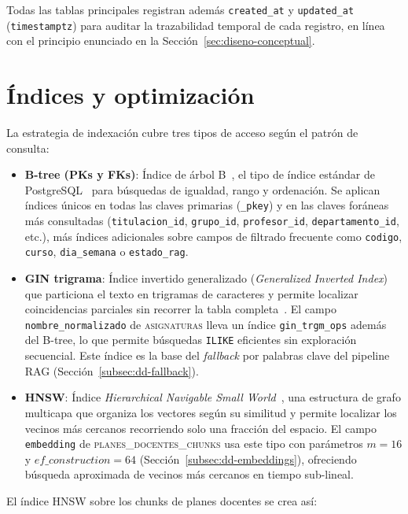 Todas las tablas principales registran además \texttt{created\_at} y \texttt{updated\_at} (\texttt{timestamptz}) para auditar la trazabilidad temporal de cada registro, en línea con el principio enunciado en la Sección~\ref{sec:diseno-conceptual}.

\section{Índices y optimización}\label{sec:indices}

La estrategia de indexación cubre tres tipos de acceso según el patrón de consulta:

\begin{itemize}
    \item \textbf{B-tree (PKs y FKs)}: Índice de árbol B~\cite{bayer1972btree}, el tipo de índice estándar de PostgreSQL~\cite{postgresBtree} para búsquedas de igualdad, rango y ordenación. Se aplican índices únicos en todas las claves primarias (\texttt{\_pkey}) y en las claves foráneas más consultadas (\texttt{titulacion\_id}, \texttt{grupo\_id}, \texttt{profesor\_id}, \texttt{departamento\_id}, etc.), más índices adicionales sobre campos de filtrado frecuente como \texttt{codigo}, \texttt{curso}, \texttt{dia\_semana} o \texttt{estado\_rag}.
    \item \textbf{GIN trigrama}: Índice invertido generalizado (\textit{Generalized Inverted Index}) que particiona el texto en trigramas de caracteres y permite localizar coincidencias parciales sin recorrer la tabla completa~\cite{postgresPgTrgm}. El campo \texttt{nombre\_normalizado} de \textsc{asignaturas} lleva un índice \texttt{gin\_trgm\_ops} además del B-tree, lo que permite búsquedas \texttt{ILIKE} eficientes sin exploración secuencial. Este índice es la base del \textit{fallback} por palabras clave del pipeline RAG (Sección~\ref{subsec:dd-fallback}).
    \item \textbf{HNSW}: Índice \textit{Hierarchical Navigable Small World}~\cite{malkov2018hnsw}, una estructura de grafo multicapa que organiza los vectores según su similitud y permite localizar los vecinos más cercanos recorriendo solo una fracción del espacio. El campo \texttt{embedding} de \textsc{planes\_docentes\_chunks} usa este tipo con parámetros $m=16$ y $ef\_construction=64$ (Sección~\ref{subsec:dd-embeddings}), ofreciendo búsqueda aproximada de vecinos más cercanos en tiempo sub-lineal.
\end{itemize}

El índice HNSW sobre los chunks de planes docentes se crea así:

